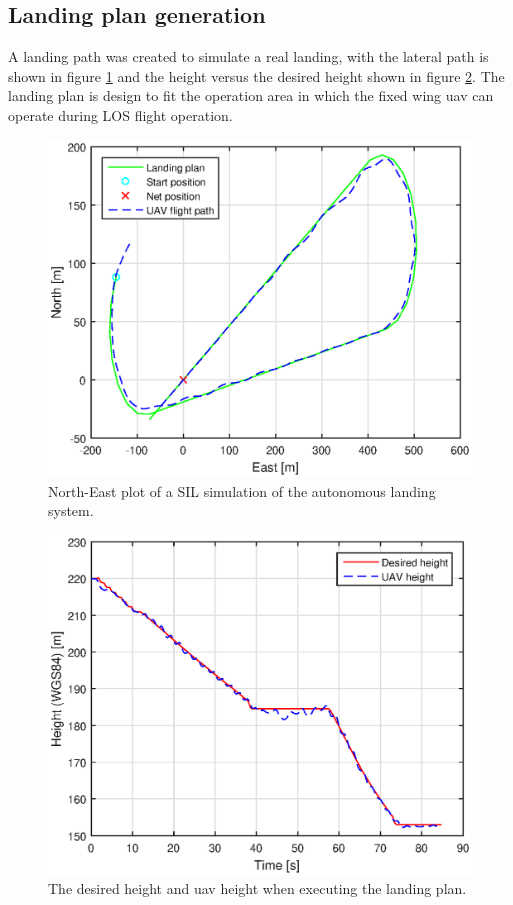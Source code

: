 \subsection{Landing plan generation}
A landing path was created to simulate a real landing, with the lateral path is shown in figure \ref{Fig:SILNorthEast090145} and the height versus the desired height  shown in figure \ref{Fig:SILHeight6juni090145}. The landing plan is design to fit the operation area in which the fixed wing \gls{uav} can operate during LOS flight operation.
\begin{figure}[H]
\centering
\includegraphics[scale=0.7]{figs/SysPlot/SILNorthEast6juni090145.eps}
\caption{North-East plot of a SIL simulation of the autonomous landing system.}
\label{Fig:SILNorthEast090145}
\end{figure}
\begin{figure}[H]
\centering
\includegraphics[scale=0.7]{figs/SysPlot/SILHeight6juni090145.eps}
\caption{The desired height and \gls{uav} height when executing the landing plan.}
\label{Fig:SILHeight6juni090145}
\end{figure}
